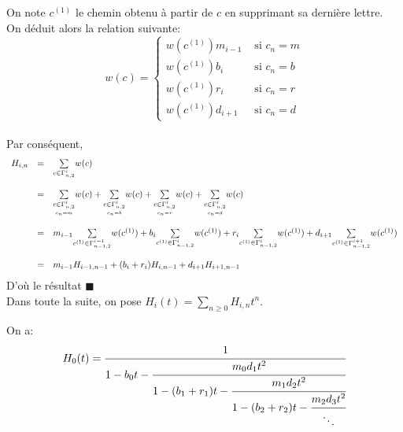 On note $c^{(1)}$ le chemin obtenu à partir de $c$ en
supprimant sa dernière lettre. \\On déduit alors la relation suivante:
$$
	w(c) = \begin{cases}
		w(c^{(1)})m_{i-1} & \text{ si }c_{n}=m \\
		w(c^{(1)})b_{i}   & \text{ si }c_{n}=b \\
		w(c^{(1)})r_{i}   & \text{ si }c_{n}=r \\
		w(c^{(1)})d_{i+1} & \text{ si }c_{n}=d
	\end{cases}
$$\vspace{5pt}\\
Par conséquent,
\[
	\begin{array}{r c l}
		H_{i,n} & =       & \underset{c \in \Gamma_{n,2}^{i}}{\sum}w(c)                                              \\
		        & \text{} &                                                                                          \\
		        & =       & \underset{\scriptstyle\underset{c_{n}=m}{ c \in \Gamma_{n,2}^{i}}}{\sum}w(c)+
		\underset{\scriptstyle \underset{c_{n}=b}{c\in \Gamma_{n,2}^{i}}}{\sum}w(c)+
		\underset{\scriptstyle \underset{c_{n}=r}{c\in \Gamma_{n,2}^{i}}}{\sum}w(c)+
		\underset{\scriptstyle \underset{c_{n}=d}{c\in \Gamma_{n,2}^{i}}}{\sum}w(c)                                  \\
		        & \text{} &                                                                                          \\
		        & =       & m_{i-1}\underset{c^{(1)}\in \Gamma_{n-1,2}^{i-1}}{\sum}w(c^{(1)})+b_{i}\underset{c^{(1)}
			\in \Gamma_{n-1,2}^{i}}{\sum}w(c^{(1)})+r_{i}\underset{c^{(1)}\in \Gamma_{n-1,2}^{i}}{\sum}
		w(c^{(1)})+d_{i+1}\underset{c^{(1)} \in \Gamma_{n-1,2}^{i+1}}{\sum}w(c^{(1)})                                \\
		        & \text{} &                                                                                          \\
		        & =       & m_{i-1}H_{i-1,n-1}+(b_{i}+r_{i})H_{i,n-1}+d_{i+1}H_{i+1,n-1}\hspace{5pt}
	\end{array}
\]D'où le résultat $\blacksquare$\vspace{15pt}\\
Dans toute la suite, on pose $H_{i}(t) = \underset{n\geq 0}{\sum}H_{i, n}t^{n}$.
\begin{proposition}\label{H-frac} On a:
	\[
		\begin{array}{r c l}
			H_{0}(t)=\cfrac{1}{1-b_{0}t-\cfrac{m_{0}d_{1}t^2}{1-(b_{1}+r_{1})t-\cfrac{m_{1}d_{2}t^2}
			{1-(b_{2}+r_{2})t-\cfrac{m_{2}d_{3}t^2}{\ddots}}}}
		\end{array}
	\]
\end{proposition}
